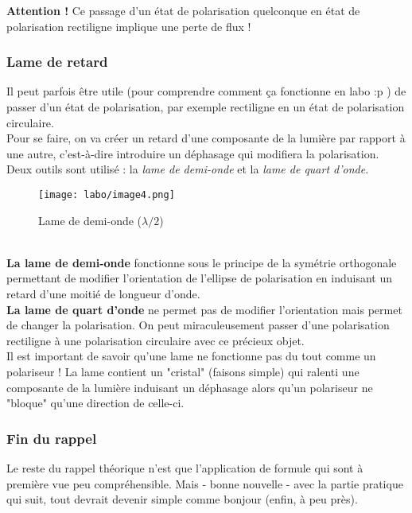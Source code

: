 \documentclass[british,french,11pt, a4paper, openany]{book}
\begin{document}
		\textbf{Attention !} Ce passage d'un état de polarisation quelconque en état de polarisation rectiligne implique une perte de flux !
		
		\subsubsection*{Lame de retard}
		Il peut parfois être utile (pour comprendre comment ça fonctionne en labo :p ) de passer d'un état de polarisation, par exemple rectiligne en un état de polarisation circulaire.\\
		Pour se faire, on va créer un retard d'une composante de la lumière par rapport à une autre, c'est-à-dire introduire un déphasage qui modifiera la polarisation. Deux outils sont utilisé : la \textit{lame de demi-onde} et la \textit{lame de quart d'onde}.
		\begin{figure}[h]
			\begin{center}
				\texttt{[image: labo/image4.png]}
			\end{center}
			\caption{Lame de demi-onde ($\lambda/2$)}
			\label{lamedemo}
		\end{figure}\  \\
		
		\textbf{La lame de demi-onde} fonctionne sous le principe de la symétrie orthogonale permettant de modifier l'orientation de l'ellipse de polarisation en induisant un retard d'une moitié de longueur d'onde.\\
		
		\textbf{La lame de quart d'onde} ne permet pas de modifier l'orientation mais permet de changer la polarisation. On peut miraculeusement passer d'une polarisation rectiligne à une polarisation circulaire avec ce précieux objet.\\
		
		Il est important de savoir qu'une lame ne fonctionne pas du tout comme un polariseur ! La lame contient un "cristal" (faisons simple) qui ralenti une composante de la lumière induisant un déphasage alors qu'un polariseur ne "bloque" qu'une direction de celle-ci.
		
		\subsubsection*{Fin du rappel}
		Le reste du rappel théorique n'est que l'application de formule qui sont à première vue peu compréhensible. Mais - bonne nouvelle - avec la partie pratique qui suit, tout devrait devenir simple comme bonjour (enfin, à peu près).
		
\end{document}
